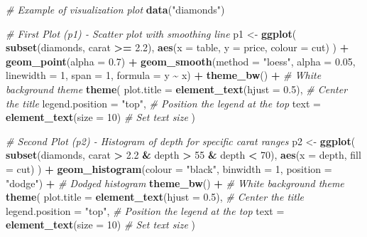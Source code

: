 \documentclass[
  12pt,
]{article}
\newenvironment{Shaded}{\begin{snugshade}}{\end{snugshade}}
\newcommand{\AttributeTok}[1]{\textcolor[rgb]{0.13,0.29,0.53}{#1}}
\newcommand{\CommentTok}[1]{\textcolor[rgb]{0.56,0.35,0.01}{\textit{#1}}}
\newcommand{\DecValTok}[1]{\textcolor[rgb]{0.00,0.00,0.81}{#1}}
\newcommand{\FloatTok}[1]{\textcolor[rgb]{0.00,0.00,0.81}{#1}}
\newcommand{\FunctionTok}[1]{\textcolor[rgb]{0.13,0.29,0.53}{\textbf{#1}}}
\newcommand{\NormalTok}[1]{#1}
\newcommand{\OtherTok}[1]{\textcolor[rgb]{0.56,0.35,0.01}{#1}}
\newcommand{\SpecialCharTok}[1]{\textcolor[rgb]{0.81,0.36,0.00}{\textbf{#1}}}
\newcommand{\StringTok}[1]{\textcolor[rgb]{0.31,0.60,0.02}{#1}}
\begin{document}
\begin{Shaded}
\begin{Highlighting}[]
\CommentTok{\# Example of visualization plot}
\FunctionTok{data}\NormalTok{(}\StringTok{"diamonds"}\NormalTok{)}

\CommentTok{\# First Plot (p1) {-} Scatter plot with smoothing line}
\NormalTok{p1 }\OtherTok{\textless{}{-}} \FunctionTok{ggplot}\NormalTok{(}
  \FunctionTok{subset}\NormalTok{(diamonds, carat }\SpecialCharTok{\textgreater{}=} \FloatTok{2.2}\NormalTok{),}
  \FunctionTok{aes}\NormalTok{(}\AttributeTok{x =}\NormalTok{ table, }\AttributeTok{y =}\NormalTok{ price, }\AttributeTok{colour =}\NormalTok{ cut)}
\NormalTok{) }\SpecialCharTok{+}
  \FunctionTok{geom\_point}\NormalTok{(}\AttributeTok{alpha =} \FloatTok{0.7}\NormalTok{) }\SpecialCharTok{+}  
  \FunctionTok{geom\_smooth}\NormalTok{(}\AttributeTok{method =} \StringTok{"loess"}\NormalTok{, }\AttributeTok{alpha =} \FloatTok{0.05}\NormalTok{,}
  \AttributeTok{linewidth =} \DecValTok{1}\NormalTok{, }\AttributeTok{span =} \DecValTok{1}\NormalTok{, }\AttributeTok{formula =}\NormalTok{ y }\SpecialCharTok{\textasciitilde{}}\NormalTok{ x) }\SpecialCharTok{+}  
  \FunctionTok{theme\_bw}\NormalTok{() }\SpecialCharTok{+}  \CommentTok{\# White background theme}
  \FunctionTok{theme}\NormalTok{(}
    \AttributeTok{plot.title =} \FunctionTok{element\_text}\NormalTok{(}\AttributeTok{hjust =} \FloatTok{0.5}\NormalTok{),  }\CommentTok{\# Center the title}
    \AttributeTok{legend.position =} \StringTok{"top"}\NormalTok{,  }\CommentTok{\# Position the legend at the top}
    \AttributeTok{text =} \FunctionTok{element\_text}\NormalTok{(}\AttributeTok{size =} \DecValTok{10}\NormalTok{)  }\CommentTok{\# Set text size}
\NormalTok{  )}

\CommentTok{\# Second Plot (p2) {-} Histogram of depth for specific carat ranges}
\NormalTok{p2 }\OtherTok{\textless{}{-}} \FunctionTok{ggplot}\NormalTok{(}
  \FunctionTok{subset}\NormalTok{(diamonds, carat }\SpecialCharTok{\textgreater{}} \FloatTok{2.2} \SpecialCharTok{\&}\NormalTok{ depth }\SpecialCharTok{\textgreater{}} \DecValTok{55} \SpecialCharTok{\&}\NormalTok{ depth }\SpecialCharTok{\textless{}} \DecValTok{70}\NormalTok{),}
  \FunctionTok{aes}\NormalTok{(}\AttributeTok{x =}\NormalTok{ depth, }\AttributeTok{fill =}\NormalTok{ cut)}
\NormalTok{) }\SpecialCharTok{+}
  \FunctionTok{geom\_histogram}\NormalTok{(}\AttributeTok{colour =} \StringTok{"black"}\NormalTok{,}
  \AttributeTok{binwidth =} \DecValTok{1}\NormalTok{, }\AttributeTok{position =} \StringTok{"dodge"}\NormalTok{) }\SpecialCharTok{+}  \CommentTok{\# Dodged histogram}
  \FunctionTok{theme\_bw}\NormalTok{() }\SpecialCharTok{+}  \CommentTok{\# White background theme}
  \FunctionTok{theme}\NormalTok{(}
    \AttributeTok{plot.title =} \FunctionTok{element\_text}\NormalTok{(}\AttributeTok{hjust =} \FloatTok{0.5}\NormalTok{),  }\CommentTok{\# Center the title}
    \AttributeTok{legend.position =} \StringTok{"top"}\NormalTok{,  }\CommentTok{\# Position the legend at the top}
    \AttributeTok{text =} \FunctionTok{element\_text}\NormalTok{(}\AttributeTok{size =} \DecValTok{10}\NormalTok{)  }\CommentTok{\# Set text size}
\NormalTok{  )}


\end{Highlighting}
\end{Shaded}
\end{document}
